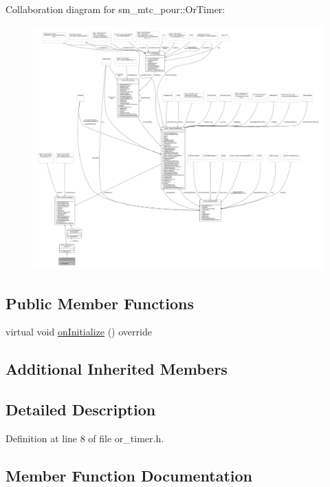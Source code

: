 Collaboration diagram for sm\+\_\+mtc\+\_\+pour\+:\+:Or\+Timer\+:
\nopagebreak
\begin{figure}[H]
\begin{center}
\leavevmode
\includegraphics[width=350pt]{classsm__mtc__pour_1_1OrTimer__coll__graph}
\end{center}
\end{figure}
\subsection*{Public Member Functions}
\begin{DoxyCompactItemize}
\item 
virtual void \hyperlink{classsm__mtc__pour_1_1OrTimer_a7b9980e6ce5cfc2e91a685b1b4702369}{on\+Initialize} () override
\end{DoxyCompactItemize}
\subsection*{Additional Inherited Members}


\subsection{Detailed Description}


Definition at line 8 of file or\+\_\+timer.\+h.



\subsection{Member Function Documentation}
